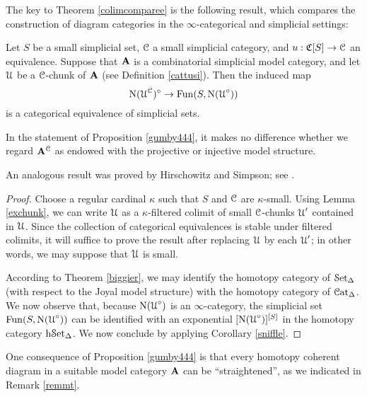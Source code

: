 The key to Theorem \ref{colimcomparee} is the following result, which compares
the construction of diagram categories in the $\infty$-categorical and simplicial settings:

\begin{proposition}\label{gumby444}
Let $S$ be a small simplicial set, $\operatorname{\mathcal{C}}$ a small simplicial category, and 
$u: \operatorname{\mathfrak{C}}[S] \rightarrow \operatorname{\mathcal{C}}$ an equivalence. Suppose that
${\mathbf A}$ is a combinatorial simplicial model category, and let
$\operatorname{\mathcal{U}}$ be a $\operatorname{\mathcal{C}}$-chunk of ${\mathbf A}$ (see Definition \ref{cattusi}). 
Then the induced map
$$ \operatorname{N} ( \operatorname{\mathcal{U}}^{\operatorname{\mathcal{C}}} )^{\circ}  \rightarrow \operatorname{Fun}(S,
\operatorname{N}(\operatorname{\mathcal{U}}^{\circ}) )$$ is a categorical equivalence of
simplicial sets.
\end{proposition}

\begin{remark}
In the statement of Proposition \ref{gumby444}, it makes no difference whether we regard
${\mathbf A}^{\operatorname{\mathcal{C}}}$ as endowed with the projective or injective model structure.
\end{remark}

\begin{remark}
An analogous result was proved by Hirschowitz and Simpson; see \cite{hirschowitz}.
\end{remark}

\begin{proof}
Choose a regular cardinal $\kappa$ such that $S$ and $\operatorname{\mathcal{C}}$ are $\kappa$-small.
Using Lemma \ref{exchunk}, we can write $\operatorname{\mathcal{U}}$ as a $\kappa$-filtered colimit
of small $\operatorname{\mathcal{C}}$-chunks $\operatorname{\mathcal{U}}'$ contained in $\operatorname{\mathcal{U}}$. Since the collection of
categorical equivalences is stable under filtered colimits, it will suffice to prove the
result after replacing $\operatorname{\mathcal{U}}$ by each $\operatorname{\mathcal{U}}'$; in other words, we may suppose that
$\operatorname{\mathcal{U}}$ is small. 

According to Theorem \ref{biggier}, we may identify
the homotopy category of $\operatorname{\mathcal{S}et_{\Delta}}$ (with respect to the Joyal model
structure) with the homotopy category of $\operatorname{\mathcal{C}at_{\Delta}}$. We now observe that, because
$\operatorname{N}( \operatorname{\mathcal{U}}^{\circ})$ is an $\infty$-category, the simplicial set
$\operatorname{Fun}(S,\operatorname{N}( \operatorname{\mathcal{U}}^{\circ}))$ can be identified with an exponential
$[ \operatorname{N}(\operatorname{\mathcal{U}}^{\circ}) ]^{ [S] }$ in the homotopy category $\rm{h} \it{\operatorname{\mathcal{S}et_{\Delta}}}$. We now conclude by applying Corollary \ref{sniffle}.
\end{proof}

One consequence of Proposition \ref{gumby444} is that every homotopy coherent diagram
in a suitable model category ${\mathbf A}$ can be ``straightened'', as we indicated in Remark \ref{remmt}.

